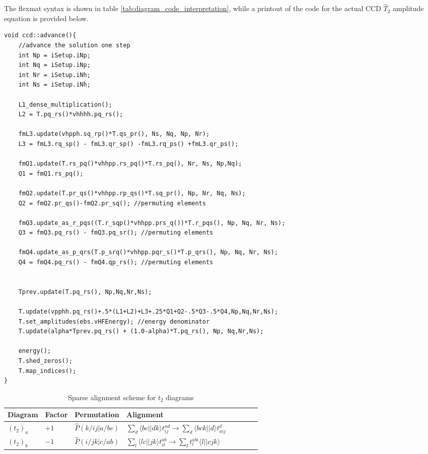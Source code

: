 The flexmat syntax is shown in table \ref{tab:diagram_code_interpretation}, while a printout of the code for the actual CCD $\hat{T}_2$ amplitude equation is provided below. 

\begin{verbatim}
void ccd::advance(){
    //advance the solution one step
    int Np = iSetup.iNp;
    int Nq = iSetup.iNp;
    int Nr = iSetup.iNh;
    int Ns = iSetup.iNh;

    L1_dense_multiplication();
    L2 = T.pq_rs()*vhhhh.pq_rs();
    
    fmL3.update(vhpph.sq_rp()*T.qs_pr(), Ns, Nq, Np, Nr);
    L3 = fmL3.rq_sp() - fmL3.qr_sp() -fmL3.rq_ps() +fmL3.qr_ps();

    fmQ1.update(T.rs_pq()*vhhpp.rs_pq()*T.rs_pq(), Nr, Ns, Np,Nq);
    Q1 = fmQ1.rs_pq();

    fmQ2.update(T.pr_qs()*vhhpp.rp_qs()*T.sq_pr(), Np, Nr, Nq, Ns);
    Q2 = fmQ2.pr_qs()-fmQ2.pr_sq(); //permuting elements

    fmQ3.update_as_r_pqs((T.r_sqp()*vhhpp.prs_q())*T.r_pqs(), Np, Nq, Nr, Ns);
    Q3 = fmQ3.pq_rs() - fmQ3.pq_sr(); //permuting elements

    fmQ4.update_as_p_qrs(T.p_srq()*vhhpp.pqr_s()*T.p_qrs(), Np, Nq, Nr, Ns); 
    Q4 = fmQ4.pq_rs() - fmQ4.qp_rs(); //permuting elements


    Tprev.update(T.pq_rs(), Np,Nq,Nr,Ns);

    T.update(vpphh.pq_rs()+.5*(L1+L2)+L3+.25*Q1+Q2-.5*Q3-.5*Q4,Np,Nq,Nr,Ns);
    T.set_amplitudes(ebs.vHFEnergy); //energy denominator
    T.update(alpha*Tprev.pq_rs() + (1.0-alpha)*T.pq_rs(), Np, Nq,Nr,Ns);

    energy();
    T.shed_zeros();
    T.map_indices();
}

\end{verbatim}

\FloatBarrier

\begin{table}[hbpt]
\centering
\caption{Sparse alignment scheme for $t_2$ diagrams}
\label{tab:sparse_alignments_t2}
\begin{tabular}{llllllll}
Diagram  & Factor & Permutation & Alignment   \\ \hline
$(t_2)_a$&$+1$& $\hat{P}(k/ij \vert a/bc)$ & $\sum_{d} \langle bc \vert \vert dk \rangle t^{ad}_{ij} \rightarrow \sum_d \langle bck \vert \vert d \rangle t^d_{aij} $ \\
$(t_2)_b$&$-1$& $\hat{P}(i/jk \vert c/ab)$ & $\sum_{l} \langle lc \vert \vert jk \rangle t^{ab}_{il} \rightarrow \sum_l t^{abi}_{l} \langle l \vert \vert cjk \rangle  $  \\
\end{tabular}
\end{table}


